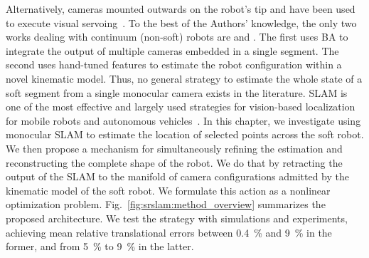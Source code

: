%
%
%
%
%
%
%
Alternatively, cameras mounted outwards on the robot's tip and have been used to execute visual servoing~\citep{homberg2019robust}.
%
To the best of the Authors' knowledge, the only two works dealing with continuum (non-soft) robots are \citep{weber2012multi} and \citep{cheng2020approximate}.
% 
The first uses \gls{BA} to integrate the output of multiple cameras embedded in a single segment. The second uses hand-tuned features to estimate the robot configuration within a novel kinematic model. Thus, no general strategy to estimate the whole state of a soft segment from a single monocular camera exists in the literature.
%
\gls{SLAM} is one of the most effective and largely used strategies for vision-based localization for mobile robots and autonomous vehicles~\citep{fuentes2015visual,mur2017orb}. %
%
In this chapter, we investigate using monocular \gls{SLAM} to estimate the location of selected points across the soft robot. We then propose a mechanism for simultaneously refining the estimation and reconstructing the complete shape of the robot. We do that by retracting the output of the \gls{SLAM} to the manifold of camera configurations admitted by the kinematic model of the soft robot. We formulate this action as a nonlinear optimization problem. Fig.~\ref{fig:srslam:method_overview} summarizes the proposed architecture. We test the strategy with simulations and experiments, achieving mean relative translational errors between \SI{0.4}{\percent} and \SI{9}{\percent} in the former, and from \SI{5}{\percent} to \SI{9}{\percent} in the latter.

